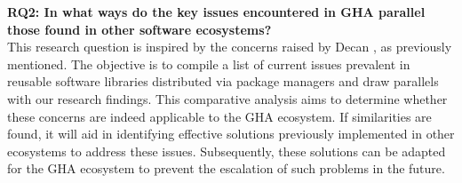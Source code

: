\documentclass[conference]{IEEEtran}
\begin{document}
 \textbf{RQ2: In what ways do the key issues encountered in GHA parallel those found in other software ecosystems?}\\

    This research question is inspired by the concerns raised by Decan \cite{decan2022use}, as previously mentioned. The objective is to compile a list of current issues prevalent in reusable software libraries distributed via package managers and draw parallels with our research findings. This comparative analysis aims to determine whether these concerns are indeed applicable to the GHA ecosystem. If similarities are found, it will aid in identifying effective solutions previously implemented in other ecosystems to address these issues. Subsequently, these solutions can be adapted for the GHA ecosystem to prevent the escalation of such problems in the future.



\end{document}
